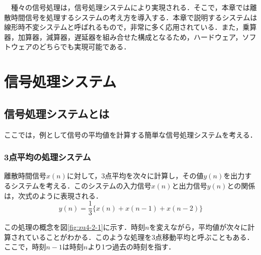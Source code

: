 
\begin{lead}
　種々の信号処理は，信号処理システムにより実現される．そこで，本章では離散時間信号を処理するシステムの考え方を導入する．本章で説明するシステムは線形時不変システムと呼ばれるもので，非常に多く応用されている．また，乗算器，加算器，減算器，遅延器を組み合せた構成となるため，ハードウェア，ソフトウェアのどちらでも実現可能である．

\end{lead}




\chapter{信号処理システム}
\label{chapter:ch-2}


\section{信号処理システムとは}

ここでは，例として信号の平均値を計算する簡単な信号処理システムを考える．

\subsection{3点平均の処理システム}

離散時間信号$x(n)$に対して，3点平均を次々に計算し，その値$y(n)$を出力するシステムを考える．このシステムの入力信号$x(n)$と出力信号$y(n)$との関係は，次式のように表現される．
\begin{equation}
y(n)=\frac{1}{3}\{ x(n) + x(n-1) +x(n-2) \}
\label{eqn:eqn2-1}
\end{equation}

この処理の概念を図\ref{fig:zu4-2-1}に示す．時刻$n$を変えながら，平均値が次々に計算されていることがわかる．このような処理を3点移動平均と呼ぶこともある．ここで，時刻$n-1$は時刻$n$より1つ過去の時刻を指す．

